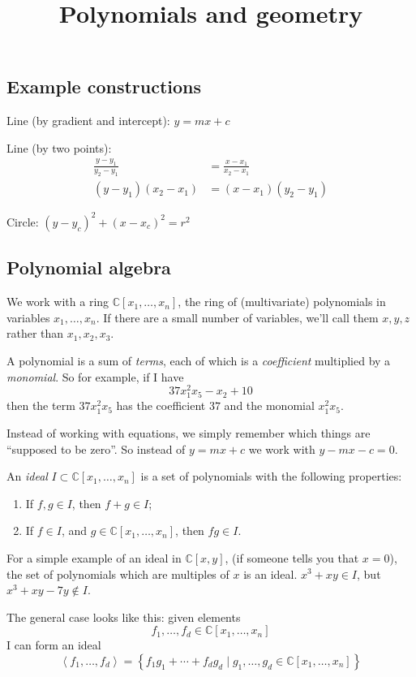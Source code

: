 \documentclass[a4paper, 14pt]{extarticle}
\title{Polynomials and geometry}
\newcommand{\bC}{\mathbb{C}}
\begin{document}
\maketitle

\subsection*{Example constructions}

Line (by gradient and intercept): $y=mx+c$

Line (by two points):
\begin{align*}
  \frac{y-y_1}{y_2-y_1} &= \frac{x-x_1}{x_2-x_1}\\
  (y-y_1)(x_2-x_1) &= (x-x_1)(y_2-y_1)
\end{align*}

Circle: $(y-y_c)^2 + (x-x_c)^2 = r^2$

\subsection*{Polynomial algebra}

We work with a ring $\bC[x_1,\ldots,x_n]$, the ring of (multivariate)
polynomials in variables $x_1,\ldots,x_n$. If there are a small number
of variables, we'll call them $x, y, z$ rather than $x_1, x_2, x_3$.

A polynomial is a sum of \emph{terms}, each of which is a
\emph{coefficient} multiplied by a \emph{monomial}. So for example, if
I have
\[37x_1^2x_5 - x_2 + 10\]
then the term $37x_1^2x_5$ has the coefficient $37$ and the monomial
$x_1^2x_5$.

Instead of working with equations, we simply remember which things are
``supposed to be zero''. So instead of $y=mx+c$ we work with
$y-mx-c=0$.

An \emph{ideal} $I\subset\bC[x_1,\ldots,x_n]$ is a set of polynomials
with the following properties:
\begin{enumerate}
\item If $f,g\in I$, then $f+g\in I$;
\item If $f\in I$, and $g\in\bC[x_1,\ldots,x_n]$, then $fg\in I$.
\end{enumerate}

For a simple example of an ideal in $\bC[x,y]$, (if someone tells you
that $x=0$), the set of polynomials which are multiples of $x$ is an
ideal.  $x^3+xy\in I$, but $x^3 + xy - 7y \notin I$.

The general case looks like this: given elements
\[f_1,\ldots,f_d\in\bC[x_1,\ldots,x_n]\]
I can form an ideal
\[\left<f_1,\ldots,f_d\right> = \left\{f_1g_1+\cdots+f_dg_d\mid g_1,\ldots,g_d\in\bC[x_1,\ldots,x_n]\right\}\]
\end{document}
